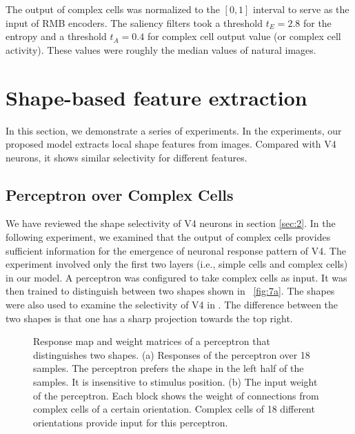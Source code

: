 \documentclass[10pt]{article}
\begin{document}
The output of complex cells was normalized to the $[0,1]$ interval
to serve as the input of RMB encoders.
The saliency filters took a threshold $t_E=2.8$ for the entropy
and a threshold $t_A=0.4$ for complex cell output value (or complex cell activity).
These values were roughly the median values of natural images.

\section{Shape-based feature extraction}\label{sec:4}

In this section, we demonstrate a series of experiments.
In the experiments, our proposed model extracts local shape features from images.
Compared with V4 neurons, it shows similar selectivity for different features.

\subsection{Perceptron over Complex Cells}

We have reviewed the shape selectivity of V4 neurons in section \ref{sec:2}.
In the following experiment, we examined that the output of complex cells provides sufficient information
for the emergence of neuronal response pattern of V4.
The experiment involved only the first two layers (i.e., simple cells and complex cells) in our model.
A perceptron was configured to take complex cells as input.
It was then trained to distinguish between two shapes shown in \figurename~\ref{fig:7a}.
The shapes were also used to examine the selectivity of V4 in \cite{pasupathy2001}.
The difference between the two shapes is that one has a sharp projection towards the top right.

\begin{figure}
\centering
{}\hfil
{}
\caption{Response map and weight matrices of a perceptron that distinguishes two shapes.
(a) Responses of the perceptron over 18 samples.
The perceptron prefers the shape in the left half of the samples.
It is insensitive to stimulus position.
(b) The input weight of the perceptron. 
Each block shows the weight of connections from complex cells of a certain orientation.
Complex cells of 18 different orientations provide input for this perceptron.}
\label{fig:7}
\end{figure}
\end{document}

